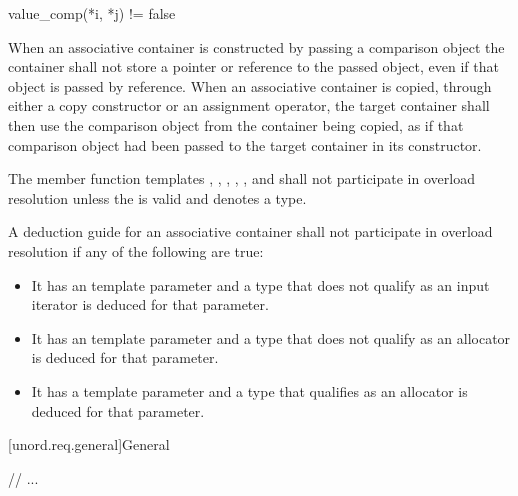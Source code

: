 \documentclass{wg21}
\begin{document}
\begin{codeblock}
    value_comp(*i, *j) != false
\end{codeblock}

\pnum
When an associative container is constructed by passing a comparison object the
container shall not store a pointer or reference to the passed object,
even if that object is passed by reference.
When an associative container is copied, through either a copy constructor
or an assignment operator,
the target container shall then use the comparison object from the container
being copied,
as if that comparison object had been passed to the target container in
its constructor.

\pnum
The member function templates
, , ,
, , and 
shall not participate in overload resolution unless
the   is valid
and denotes a type.

\pnum
A deduction guide for an associative container shall not participate in overload resolution
if any of the following are true:
\begin{itemize}
    \item It has an  template parameter
    and a type that does not qualify as an input iterator is deduced for that parameter.

    \item It has an  template parameter
    and a type that does not qualify as an allocator is deduced for that parameter.

    \item It has a  template parameter
    and a type that qualifies as an allocator is deduced for that parameter.
\end{itemize}


[unord.req.general]{General}

// ...
\end{document}
